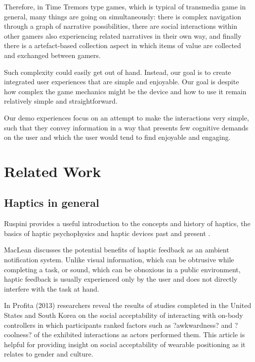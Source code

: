 \documentclass{chi-ext}
\begin{document}
Therefore, in Time Tremors type games, which is typical of transmedia game in general, many things are going on simultaneously: there is complex navigation through a graph of narrative possibilities, there are social interactions within other gamers also experiencing related narratives in their own way, and finally there is a artefact-based collection aspect in which items of value are collected and exchanged between gamers. 

Such complexity could easily get out of hand. Instead, our goal is to create integrated user experiences that are simple and enjoyable. Our goal is despite how complex the game mechanics might be the device and how to use it remain relatively simple and straightforward.

Our demo experiences focus on an attempt to make the interactions very simple, such that they convey information in a way that presents few cognitive demands on the user and which the user would tend to find enjoyable and engaging.

\section{Related Work}

\subsection{Haptics in general}
Ruspini provides a useful introduction to the concepts and history of haptics, the basics of haptic psychophysics and haptic devices past and present \cite{ruspini1999haptics}.

MacLean \cite{maclean2009putting} discusses the potential benefits of haptic feedback as an ambient notification system. Unlike visual information, which can be obtrusive while completing a task, or sound, which can be obnoxious in a public environment, haptic feedback is usually experienced only by the user and does not directly interfere with the task at hand. 

In Profita (2013) \cite{profita2013don} researchers reveal the results of studies completed in the United States and South Korea on the social acceptability of interacting with on-body controllers in which participants  ranked factors such as ?awkwardness? and ?coolness? of the exhibited interactions as actors performed them. This article is helpful for providing insight on social acceptability of wearable positioning as it relates to gender and culture.
\end{document}
